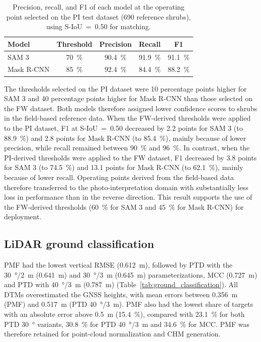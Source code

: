 \documentclass[12pt,a4paper]{article}
\begin{document}
\begin{table}[ht]
    \centering
    \caption{
        Precision, recall, and F1 of each model at the operating point selected on the PI test dataset (690 reference shrubs), using S-IoU~=~0.50 for matching.
    }
    \label{tab:pi_operating_points}
    \begin{tabular}{lcccc}
        \toprule
        Model & Threshold & Precision & Recall & F1 \\
        \midrule
        SAM 3 & \qty{70}{\percent} & \qty{90.4}{\percent} & \qty{91.9}{\percent} & \qty{91.1}{\percent} \\
        Mask R-CNN & \qty{85}{\percent} & \qty{92.4}{\percent} & \qty{84.4}{\percent} & \qty{88.2}{\percent} \\
        \bottomrule
    \end{tabular}
\end{table}

The thresholds selected on the PI dataset were 10 percentage points higher for SAM 3 and 40 percentage points higher for Mask R-CNN than those selected on the FW dataset. Both models therefore assigned lower confidence scores to shrubs in the field-based reference data. When the FW-derived thresholds were applied to the PI dataset, F1 at S-IoU~=~0.50 decreased by 2.2 points for SAM 3 (to \qty{88.9}{\percent}) and 2.8 points for Mask R-CNN (to \qty{85.4}{\percent}), mainly because of lower precision, while recall remained between \qty{90}{\percent} and \qty{96}{\percent}. In contrast, when the PI-derived thresholds were applied to the FW dataset, F1 decreased by 3.8 points for SAM 3 (to \qty{74.5}{\percent}) and 13.1 points for Mask R-CNN (to \qty{62.1}{\percent}), mainly because of lower recall. Operating points derived from the field-based data therefore transferred to the photo-interpretation domain with substantially less loss in performance than in the reverse direction. This result supports the use of the FW-derived thresholds (\qty{60}{\percent} for SAM 3 and \qty{45}{\percent} for Mask R-CNN) for deployment.

\subsection{LiDAR ground classification}

PMF had the lowest vertical RMSE (\qty{0.612}{\metre}), followed by PTD with the \qty{30}{\degree}/\qty{2}{\metre} (\qty{0.641}{\metre}) and \qty{30}{\degree}/\qty{3}{\metre} (\qty{0.645}{\metre}) parameterizations, MCC (\qty{0.727}{\metre}) and PTD with \qty{40}{\degree}/\qty{3}{\metre} (\qty{0.787}{\metre}) (Table~\ref{tab:ground_classification}). All DTMs overestimated the GNSS heights, with mean errors between \qty{0.356}{\metre} (PMF) and \qty{0.517}{\metre} (PTD \qty{40}{\degree}/\qty{3}{\metre}). PMF also had the lowest share of targets with an absolute error above \qty{0.5}{\metre} (\qty{15.4}{\percent}), compared with \qty{23.1}{\percent} for both PTD \qty{30}{\degree} variants, \qty{30.8}{\percent} for PTD \qty{40}{\degree}/\qty{3}{\metre} and \qty{34.6}{\percent} for MCC. PMF was therefore retained for point-cloud normalization and CHM generation.
\end{document}
